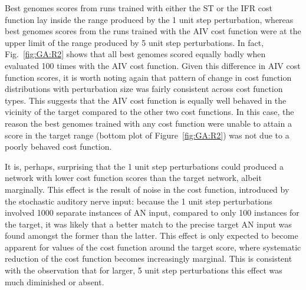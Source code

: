 
\smallskip{}

Best genomes scores from {\GA} runs trained with either the ST or the IFR cost
function lay inside the range produced by the 1 unit step perturbation, whereas
best genomes scores from the {\GA} runs trained with the AIV cost function were at
the upper limit of the range produced by 5 unit step perturbations. In fact,
Fig.~\ref{fig:GA:R2} shows that all best genomes scored equally badly when
evaluated 100 times with the AIV cost function. Given this difference in AIV
cost function scores, it is worth noting again that pattern of change in cost
function distributions with perturbation size was fairly consistent across cost
function types. This suggests that the AIV cost function is equally well behaved
in the vicinity of the target compared to the other two cost functions. In this
case, the reason the best genomes trained with any cost function were unable to
attain a score in the target range (bottom plot of Figure~\ref{fig:GA:R2}) was not
due to a poorly behaved cost function. 


\smallskip{}

It is, perhaps, surprising that the 1 unit step perturbations could produced a
network with lower cost function scores than the target network, albeit
marginally. This effect is the result of noise in the cost function, introduced
by the stochastic auditory nerve input: because the 1 unit step perturbations
involved 1000 separate instances of AN input, compared to only 100 instances for
the target, it was likely that a better match to the precise target AN input was
found amongst the former than the latter.  This effect is only expected to
become apparent for values of the cost function around the target score, where
systematic reduction of the cost function becomes increasingly marginal. This is
consistent with the observation that for larger, 5 unit step perturbations this
effect was much diminished or absent.


